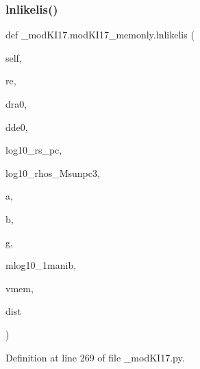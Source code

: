 \subsubsection{\texorpdfstring{lnlikelis()}{lnlikelis()}}
{\footnotesize\ttfamily def \+\_\+mod\+K\+I17.\+mod\+K\+I17\+\_\+memonly.\+lnlikelis (\begin{DoxyParamCaption}\item[{}]{self,  }\item[{}]{re,  }\item[{}]{dra0,  }\item[{}]{dde0,  }\item[{}]{log10\+\_\+rs\+\_\+pc,  }\item[{}]{log10\+\_\+rhos\+\_\+\+Msunpc3,  }\item[{}]{a,  }\item[{}]{b,  }\item[{}]{g,  }\item[{}]{mlog10\+\_\+1manib,  }\item[{}]{vmem,  }\item[{}]{dist }\end{DoxyParamCaption})}



Definition at line 269 of file \+\_\+mod\+K\+I17.\+py.


